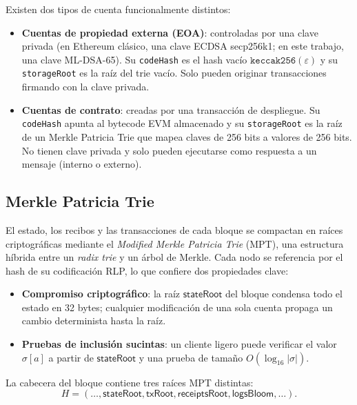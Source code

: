 Existen dos tipos de cuenta funcionalmente distintos:

\begin{itemize}
  \item \textbf{Cuentas de propiedad externa (EOA)}: controladas por una clave privada (en Ethereum clásico, una clave ECDSA secp256k1; en este trabajo, una clave ML-DSA-65). Su \texttt{codeHash} es el hash vacío $\texttt{keccak256}(\varepsilon)$ y su \texttt{storageRoot} es la raíz del trie vacío. Solo pueden originar transacciones firmando con la clave privada.
  
  \item \textbf{Cuentas de contrato}: creadas por una transacción de despliegue. Su \texttt{codeHash} apunta al bytecode EVM almacenado y su \texttt{storageRoot} es la raíz de un Merkle Patricia Trie que mapea claves de 256 bits a valores de 256 bits. No tienen clave privada y solo pueden ejecutarse como respuesta a un mensaje (interno o externo).
\end{itemize}

\subsection{Merkle Patricia Trie}
\label{sec:mpt}

El estado, los recibos y las transacciones de cada bloque se compactan en raíces criptográficas mediante el \emph{Modified Merkle Patricia Trie} (MPT), una estructura híbrida entre un \emph{radix trie} y un árbol de Merkle. Cada nodo se referencia por el hash de su codificación RLP, lo que confiere dos propiedades clave:

\begin{itemize}
  \item \textbf{Compromiso criptográfico}: la raíz $\textsf{stateRoot}$ del bloque condensa todo el estado en 32 bytes; cualquier modificación de una sola cuenta propaga un cambio determinista hasta la raíz.
  \item \textbf{Pruebas de inclusión sucintas}: un cliente ligero puede verificar el valor $\sigma[a]$ a partir de $\textsf{stateRoot}$ y una prueba de tamaño $O(\log_{16} |\sigma|)$.
\end{itemize}

La cabecera del bloque contiene tres raíces MPT distintas:
\begin{equation}
  H = (\ldots, \textsf{stateRoot}, \textsf{txRoot}, \textsf{receiptsRoot}, \textsf{logsBloom}, \ldots).
  \label{eq:header_roots}
\end{equation}

